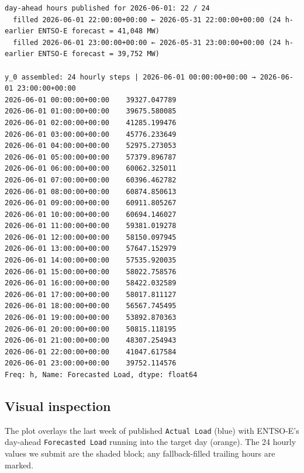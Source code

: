\documentclass[
  english,
  letterpaper,
]{scrbook}
\begin{document}
\begin{verbatim}
day-ahead hours published for 2026-06-01: 22 / 24
  filled 2026-06-01 22:00:00+00:00 ← 2026-05-31 22:00:00+00:00 (24 h-earlier ENTSO-E forecast = 41,048 MW)
  filled 2026-06-01 23:00:00+00:00 ← 2026-05-31 23:00:00+00:00 (24 h-earlier ENTSO-E forecast = 39,752 MW)

y_0 assembled: 24 hourly steps | 2026-06-01 00:00:00+00:00 → 2026-06-01 23:00:00+00:00
2026-06-01 00:00:00+00:00    39327.047789
2026-06-01 01:00:00+00:00    39675.580085
2026-06-01 02:00:00+00:00    41285.199476
2026-06-01 03:00:00+00:00    45776.233649
2026-06-01 04:00:00+00:00    52975.273053
2026-06-01 05:00:00+00:00    57379.896787
2026-06-01 06:00:00+00:00    60062.325011
2026-06-01 07:00:00+00:00    60396.462782
2026-06-01 08:00:00+00:00    60874.850613
2026-06-01 09:00:00+00:00    60911.805267
2026-06-01 10:00:00+00:00    60694.146027
2026-06-01 11:00:00+00:00    59381.019278
2026-06-01 12:00:00+00:00    58150.097945
2026-06-01 13:00:00+00:00    57647.152979
2026-06-01 14:00:00+00:00    57535.920035
2026-06-01 15:00:00+00:00    58022.758576
2026-06-01 16:00:00+00:00    58422.032589
2026-06-01 17:00:00+00:00    58017.811127
2026-06-01 18:00:00+00:00    56567.745495
2026-06-01 19:00:00+00:00    53892.870363
2026-06-01 20:00:00+00:00    50815.118195
2026-06-01 21:00:00+00:00    48307.254943
2026-06-01 22:00:00+00:00    41047.617584
2026-06-01 23:00:00+00:00    39752.114576
Freq: h, Name: Forecasted Load, dtype: float64
\end{verbatim}

\subsection{Visual inspection}\label{visual-inspection-2}

The plot overlays the last week of published \texttt{Actual\ Load}
(blue) with ENTSO-E's day-ahead \texttt{Forecasted\ Load} running into
the target day (orange). The 24 hourly values we submit are the shaded
block; any fallback-filled trailing hours are marked.
\end{document}
